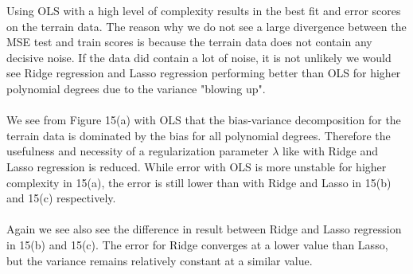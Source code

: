 \documentclass[a4paper,twocolumn]{article}
\begin{document}
Using OLS with a high level of complexity results in the best fit and error scores on the terrain data. The reason why we do not see a large divergence between the MSE test and train scores is because the terrain data does not contain any decisive noise. If the data did contain a lot of noise, it is not unlikely we would see Ridge regression and Lasso regression performing better than OLS for higher polynomial degrees due to the variance "blowing up".\\
\\
We see from Figure 15(a) with OLS that the bias-variance decomposition for the terrain data is dominated by the bias for all polynomial degrees. Therefore the usefulness and necessity of a regularization parameter $\lambda$ like with Ridge and Lasso regression is reduced. While error with OLS is more unstable for higher complexity in 15(a), the error is still lower than with Ridge and Lasso in 15(b) and 15(c) respectively. \\
\\
Again we see also see the difference in result between Ridge and Lasso regression in 15(b) and 15(c). The error for Ridge converges at a lower value than Lasso, but the variance remains relatively constant at a similar value.\\
\\
\end{document}
